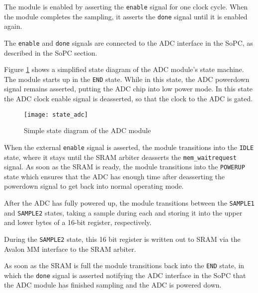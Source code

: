The module is enabled by asserting the \texttt{enable} signal for one clock cycle. When
the module completes the sampling, it asserts the \texttt{done} signal until it is enabled
again.

The \texttt{enable} and \texttt{done} signals are connected to the ADC interface
in the SoPC, as described in the SoPC section.


Figure \ref{figure:state_adc} shows a simplified state diagram of the ADC module's state
machine. The module starts up in the \texttt{END} state. While in this state, the
ADC powerdown signal remains asserted, putting the ADC chip into low power mode. In this
state the ADC clock enable signal is deasserted, so that the clock to the ADC is gated.

\begin{figure}[h!]
\begin{center}
\texttt{[image: state\_adc]}
\caption{Simple state diagram of the ADC module}
\label{figure:state_adc}
\end{center}
\end{figure}

When the external \texttt{enable} signal is asserted, the module transitions into the
\texttt{IDLE} state, where it stays until the SRAM arbiter deasserts the \texttt{mem\_waitrequest}
signal. As soon as the SRAM is ready, the module transitions into the \texttt{POWERUP} state
which ensures that the ADC has enough time after deasserting the powerdown signal to
get back into normal operating mode.

After the ADC has fully powered up, the module transitions between the \texttt{SAMPLE1} and
\texttt{SAMPLE2} states, taking a sample during each and storing it into the upper and lower
bytes of a 16-bit register, respectively.

During the \texttt{SAMPLE2} state, this 16 bit register is written out to SRAM via the
Avalon MM interface to the SRAM arbiter.

As soon as the SRAM is full the module transitions back into the \texttt{END} state, in which
the \texttt{done} signal is asserted notifying the ADC interface in the SoPC that the ADC
module has finished sampling and the ADC is powered down.



